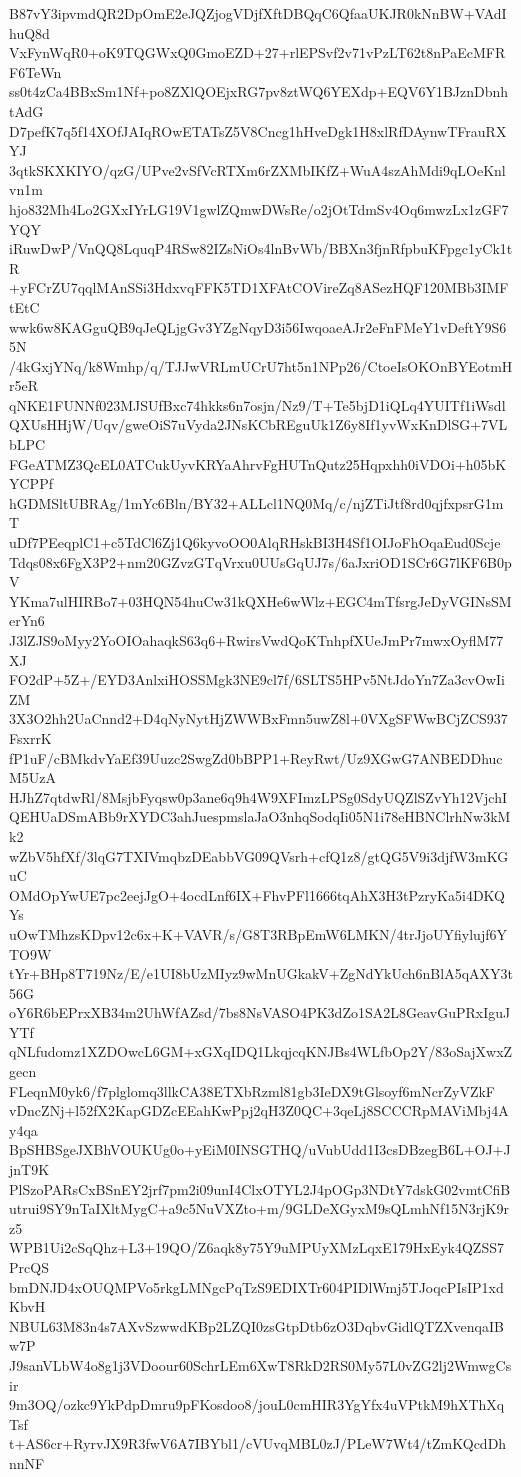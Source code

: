 B87vY3ipvmdQR2DpOmE2eJQZjogVDjfXftDBQqC6QfaaUKJR0kNnBW+VAdIhuQ8d
VxFynWqR0+oK9TQGWxQ0GmoEZD+27+rlEPSvf2v71vPzLT62t8nPaEcMFRF6TeWn
ss0t4zCa4BBxSm1Nf+po8ZXlQOEjxRG7pv8ztWQ6YEXdp+EQV6Y1BJznDbnhtAdG
D7pefK7q5f14XOfJAIqROwETATsZ5V8Cncg1hHveDgk1H8xlRfDAynwTFrauRXYJ
3qtkSKXKIYO/qzG/UPve2vSfVcRTXm6rZXMbIKfZ+WuA4szAhMdi9qLOeKnlvn1m
hjo832Mh4Lo2GXxIYrLG19V1gwlZQmwDWsRe/o2jOtTdmSv4Oq6mwzLx1zGF7YQY
iRuwDwP/VnQQ8LquqP4RSw82IZsNiOs4lnBvWb/BBXn3fjnRfpbuKFpgc1yCk1tR
+yFCrZU7qqlMAnSSi3HdxvqFFK5TD1XFAtCOVireZq8ASezHQF120MBb3IMFtEtC
wwk6w8KAGguQB9qJeQLjgGv3YZgNqyD3i56IwqoaeAJr2eFnFMeY1vDeftY9S65N
/4kGxjYNq/k8Wmhp/q/TJJwVRLmUCrU7ht5n1NPp26/CtoeIsOKOnBYEotmHr5eR
qNKE1FUNNf023MJSUfBxc74hkks6n7osjn/Nz9/T+Te5bjD1iQLq4YUITf1iWsdl
QXUsHHjW/Uqv/gweOiS7uVyda2JNsKCbREguUk1Z6y8If1yvWxKnDlSG+7VLbLPC
FGeATMZ3QcEL0ATCukUyvKRYaAhrvFgHUTnQutz25Hqpxhh0iVDOi+h05bKYCPPf
hGDMSltUBRAg/1mYc6Bln/BY32+ALLcl1NQ0Mq/c/njZTiJtf8rd0qjfxpsrG1mT
uDf7PEeqplC1+c5TdCl6Zj1Q6kyvoOO0AlqRHskBI3H4Sf1OIJoFhOqaEud0Scje
Tdqs08x6FgX3P2+nm20GZvzGTqVrxu0UUsGqUJ7s/6aJxriOD1SCr6G7lKF6B0pV
YKma7ulHIRBo7+03HQN54huCw31kQXHe6wWlz+EGC4mTfsrgJeDyVGINsSMerYn6
J3lZJS9oMyy2YoOIOahaqkS63q6+RwirsVwdQoKTnhpfXUeJmPr7mwxOyflM77XJ
FO2dP+5Z+/EYD3AnlxiHOSSMgk3NE9cl7f/6SLTS5HPv5NtJdoYn7Za3cvOwIiZM
3X3O2hh2UaCnnd2+D4qNyNytHjZWWBxFmn5uwZ8l+0VXgSFWwBCjZCS937FsxrrK
fP1uF/cBMkdvYaEf39Uuzc2SwgZd0bBPP1+ReyRwt/Uz9XGwG7ANBEDDhucM5UzA
HJhZ7qtdwRl/8MsjbFyqsw0p3ane6q9h4W9XFImzLPSg0SdyUQZlSZvYh12VjchI
QEHUaDSmABb9rXYDC3ahJuespmslaJaO3nhqSodqIi05N1i78eHBNClrhNw3kMk2
wZbV5hfXf/3lqG7TXIVmqbzDEabbVG09QVsrh+cfQ1z8/gtQG5V9i3djfW3mKGuC
OMdOpYwUE7pc2eejJgO+4ocdLnf6IX+FhvPFl1666tqAhX3H3tPzryKa5i4DKQYs
uOwTMhzsKDpv12c6x+K+VAVR/s/G8T3RBpEmW6LMKN/4trJjoUYfiylujf6YTO9W
tYr+BHp8T719Nz/E/e1UI8bUzMIyz9wMnUGkakV+ZgNdYkUch6nBlA5qAXY3t56G
oY6R6bEPrxXB34m2UhWfAZsd/7bs8NsVASO4PK3dZo1SA2L8GeavGuPRxIguJYTf
qNLfudomz1XZDOwcL6GM+xGXqIDQ1LkqjcqKNJBs4WLfbOp2Y/83oSajXwxZgecn
FLeqnM0yk6/f7plglomq3llkCA38ETXbRzml81gb3IeDX9tGlsoyf6mNcrZyVZkF
vDncZNj+l52fX2KapGDZcEEahKwPpj2qH3Z0QC+3qeLj8SCCCRpMAViMbj4Ay4qa
BpSHBSgeJXBhVOUKUg0o+yEiM0INSGTHQ/uVubUdd1I3csDBzegB6L+OJ+JjnT9K
PlSzoPARsCxBSnEY2jrf7pm2i09unI4ClxOTYL2J4pOGp3NDtY7dskG02vmtCfiB
utrui9SY9nTaIXltMygC+a9c5NuVXZto+m/9GLDeXGyxM9sQLmhNf15N3rjK9rz5
WPB1Ui2cSqQhz+L3+19QO/Z6aqk8y75Y9uMPUyXMzLqxE179HxEyk4QZSS7PrcQS
bmDNJD4xOUQMPVo5rkgLMNgcPqTzS9EDIXTr604PIDlWmj5TJoqcPIsIP1xdKbvH
NBUL63M83n4s7AXvSzwwdKBp2LZQI0zsGtpDtb6zO3DqbvGidlQTZXvenqaIBw7P
J9sanVLbW4o8g1j3VDoour60SchrLEm6XwT8RkD2RS0My57L0vZG2lj2WmwgCsir
9m3OQ/ozkc9YkPdpDmru9pFKosdoo8/jouL0cmHIR3YgYfx4uVPtkM9hXThXqTsf
t+AS6cr+RyrvJX9R3fwV6A7IBYbl1/cVUvqMBL0zJ/PLeW7Wt4/tZmKQcdDhnnNF
